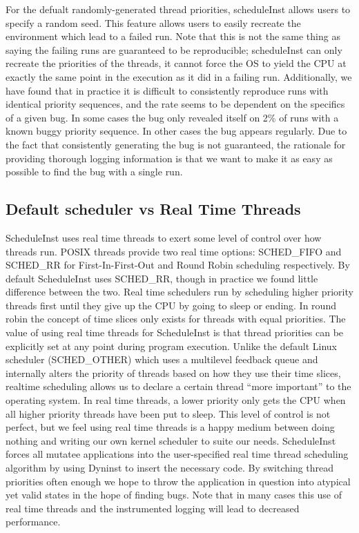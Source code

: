 \documentclass[10pt,]{article} %
\begin{document}
	For the defualt randomly-generated thread priorities, scheduleInst allows users to specify a random seed. This feature allows users to easily recreate the environment which lead to a failed run.  Note that this is not the same thing as saying the failing runs are guaranteed to be reproducible; scheduleInst can only recreate the priorities of the threads, it cannot force the OS to yield the CPU at exactly the same point in the execution as it did in a failing run.  Additionally, we have found that in practice it is difficult to consistently  reproduce runs with identical priority sequences, and the rate seems to be dependent on the specifics of a given bug. In some cases the bug only revealed itself on 2\% of runs with a known buggy priority sequence.  In other cases the bug appears regularly.  Due to the fact that consistently generating the bug is not guaranteed,  the rationale for providing thorough logging information is that we want to make it as easy as possible to find the bug with a single run. 


\subsection{Default scheduler vs Real Time Threads}

ScheduleInst uses real time threads to exert some level of control over how threads run.  POSIX threads provide two real time options: SCHED\_FIFO and SCHED\_RR for First-In-First-Out and Round Robin scheduling respectively.  By default ScheduleInst uses SCHED\_RR, though in practice we found little difference between the two.  Real time schedulers run by scheduling higher priority threads first until they give up the CPU by going to sleep or ending.  In round robin the concept of time slices only exists for threads with equal priorities. The value of using real time threads for ScheduleInst is that thread priorities can be explicitly set at any point during program execution.  Unlike the default Linux scheduler (SCHED\_OTHER) which uses a multilevel feedback queue and internally alters the priority of threads based on how they use their time slices, realtime scheduling allows us to declare a certain thread “more important” to the operating system.  In real time threads, a lower priority only gets the CPU when all higher priority threads have been put to sleep.  This level of control is not perfect, but we feel using real time threads is a happy medium between doing nothing and writing our own kernel scheduler to suite our needs.  ScheduleInst forces all mutatee applications into the user-specified real time thread scheduling algorithm by using Dyninst to insert the necessary code.  By switching thread priorities often enough we hope to throw the application in question into atypical yet valid states in the hope of finding bugs.  Note that in many cases this use of real time threads and the instrumented logging will lead to decreased performance. 
\end{document}
